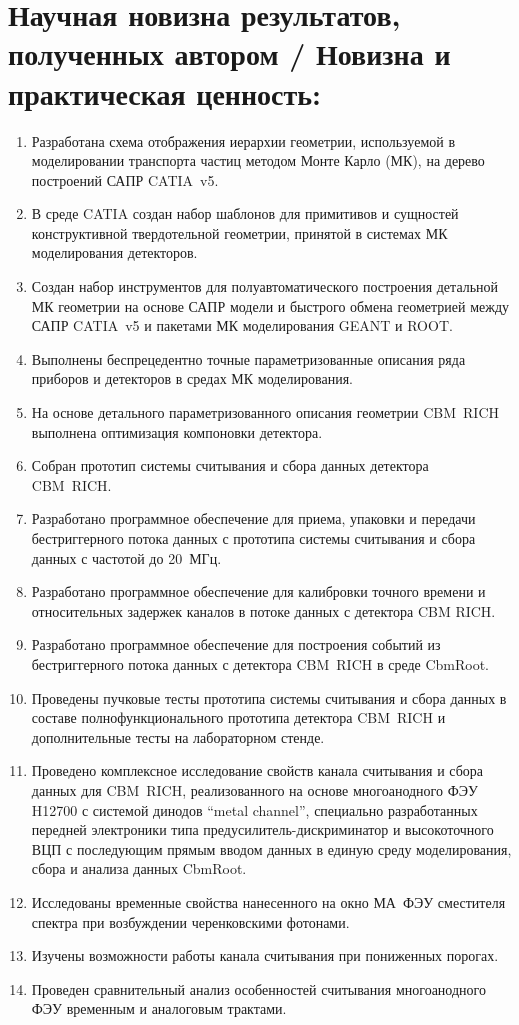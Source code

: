 \section*{Научная новизна результатов, полученных автором / Новизна и практическая ценность:\todo}

\begin{enumerate}
\item Разработана схема отображения иерархии геометрии, используемой в моделировании транспорта частиц методом Монте Карло (МК), на дерево построений САПР CATIA~v5.
\item В среде CATIA создан набор шаблонов для примитивов и сущностей конструктивной твердотельной геометрии, принятой в системах МК моделирования детекторов.
\item Создан набор инструментов для полуавтоматического построения детальной МК геометрии на основе САПР модели и быстрого обмена геометрией между САПР CATIA~v5 и пакетами МК моделирования GEANT и ROOT.
\item Выполнены беспрецедентно точные параметризованные описания ряда приборов и детекторов в средах МК моделирования.
\item На основе детального параметризованного описания геометрии CBM~RICH выполнена оптимизация компоновки детектора. 
\item Собран прототип системы считывания и сбора данных детектора CBM~RICH.
\item Разработано программное обеспечение для приема, упаковки и передачи бестриггерного потока данных с прототипа системы считывания и сбора данных с частотой до 20~МГц.
\item Разработано программное обеспечение для калибровки точного времени и относительных задержек каналов в потоке данных с детектора CBM RICH.
\item Разработано программное обеспечение для построения событий из бестриггерного потока данных с детектора CBM~RICH в среде CbmRoot.
\item Проведены пучковые тесты прототипа системы считывания и сбора данных в составе полнофункционального прототипа детектора CBM~RICH и дополнительные тесты на лабораторном стенде. 
\item Проведено комплексное исследование свойств канала считывания и сбора данных для CBM~RICH, реализованного на основе многоанодного ФЭУ H12700 с системой динодов ``metal channel'', специально разработанных передней электроники типа предусилитель-дискриминатор и высокоточного ВЦП с последующим прямым вводом данных в единую среду моделирования, сбора и анализа данных CbmRoot.
\item Исследованы временные свойства нанесенного на окно МА~ФЭУ сместителя спектра при возбуждении черенковскими фотонами.
\item Изучены возможности работы канала считывания при пониженных порогах.
\item Проведен сравнительный анализ особенностей считывания многоанодного ФЭУ временным и аналоговым трактами.
\end{enumerate}
